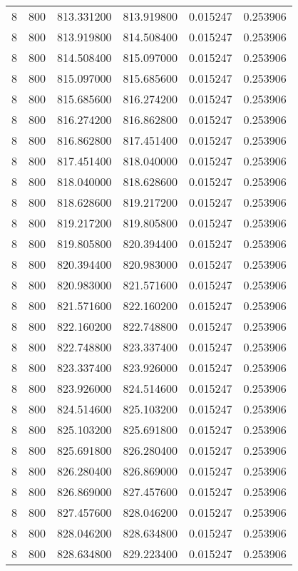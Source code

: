 \begin{longtable}{rrrrrr}
8 & 800 & 813.331200 & 813.919800 & 0.015247 & 0.253906 \\
8 & 800 & 813.919800 & 814.508400 & 0.015247 & 0.253906 \\
8 & 800 & 814.508400 & 815.097000 & 0.015247 & 0.253906 \\
8 & 800 & 815.097000 & 815.685600 & 0.015247 & 0.253906 \\
8 & 800 & 815.685600 & 816.274200 & 0.015247 & 0.253906 \\
8 & 800 & 816.274200 & 816.862800 & 0.015247 & 0.253906 \\
8 & 800 & 816.862800 & 817.451400 & 0.015247 & 0.253906 \\
8 & 800 & 817.451400 & 818.040000 & 0.015247 & 0.253906 \\
8 & 800 & 818.040000 & 818.628600 & 0.015247 & 0.253906 \\
8 & 800 & 818.628600 & 819.217200 & 0.015247 & 0.253906 \\
8 & 800 & 819.217200 & 819.805800 & 0.015247 & 0.253906 \\
8 & 800 & 819.805800 & 820.394400 & 0.015247 & 0.253906 \\
8 & 800 & 820.394400 & 820.983000 & 0.015247 & 0.253906 \\
8 & 800 & 820.983000 & 821.571600 & 0.015247 & 0.253906 \\
8 & 800 & 821.571600 & 822.160200 & 0.015247 & 0.253906 \\
8 & 800 & 822.160200 & 822.748800 & 0.015247 & 0.253906 \\
8 & 800 & 822.748800 & 823.337400 & 0.015247 & 0.253906 \\
8 & 800 & 823.337400 & 823.926000 & 0.015247 & 0.253906 \\
8 & 800 & 823.926000 & 824.514600 & 0.015247 & 0.253906 \\
8 & 800 & 824.514600 & 825.103200 & 0.015247 & 0.253906 \\
8 & 800 & 825.103200 & 825.691800 & 0.015247 & 0.253906 \\
8 & 800 & 825.691800 & 826.280400 & 0.015247 & 0.253906 \\
8 & 800 & 826.280400 & 826.869000 & 0.015247 & 0.253906 \\
8 & 800 & 826.869000 & 827.457600 & 0.015247 & 0.253906 \\
8 & 800 & 827.457600 & 828.046200 & 0.015247 & 0.253906 \\
8 & 800 & 828.046200 & 828.634800 & 0.015247 & 0.253906 \\
8 & 800 & 828.634800 & 829.223400 & 0.015247 & 0.253906 \\

\end{longtable}
